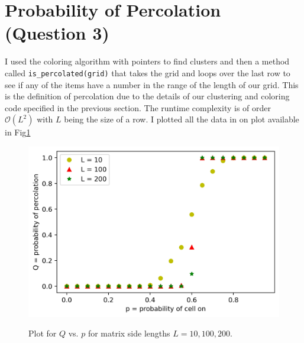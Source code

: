 \documentclass[12pt]{article}
\begin{document}
	\section{Probability of Percolation (Question 3)}
	I used the coloring algorithm with pointers to find clusters and then a method called \texttt{is\_percolated(grid)} that takes the grid and loops over the last
	row to see if any of the items have a number in the range of the length of our grid. This is the definition of percolation due to the details of
	our clustering and coloring code specified in the previous section. The runtime complexity is of order $\mathcal{O}(L^2)$ with $L$ being the 
	size of a row.
	I plotted all the data in on plot available in Fig\ref{fig:Perc}
	\begin{figure}[h!]
		\centering
		\includegraphics[width=0.9\linewidth]{../p3/percs.jpg}
		\label{fig:Perc}
		\caption{Plot for $Q$ vs. $p$ for matrix side lengths $L = 10, 100, 200$.}
	\end{figure}
	
\end{document}
